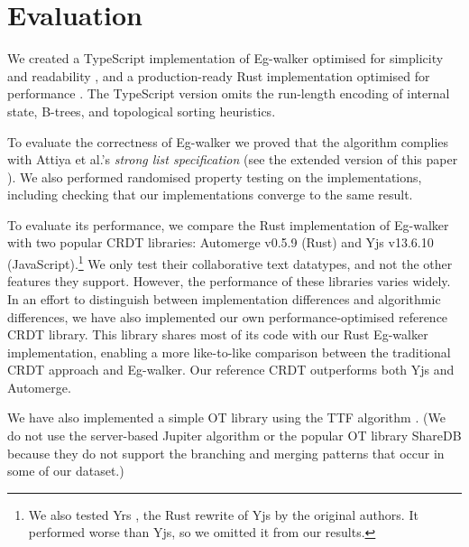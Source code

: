 \documentclass[sigplan,10pt]{acmart}
\newif\ifincludeappendix
\newcommand{\algname}{Eg-walker\xspace}
\begin{document}
\section{Evaluation}\label{benchmarking}


We created a TypeScript implementation of \algname optimised for simplicity and readability \cite{reference-reg}, and a production-ready Rust implementation optimised for performance \cite{dt}.
The TypeScript version omits the run-length encoding of internal state, B-trees, and topological sorting heuristics.

To evaluate the correctness of \algname we proved that the algorithm complies with Attiya et al.'s \emph{strong list specification} \cite{Attiya2016} (see \ifincludeappendix\autoref{proofs}\else the extended version of this paper \cite{extended-version}\fi).
We also performed randomised property testing on the implementations, including checking that our implementations converge to the same result.

To evaluate its performance, we compare the Rust implementation of \algname with two popular CRDT libraries: Automerge v0.5.9 \cite{automerge} (Rust) and Yjs v13.6.10 \cite{yjs} (JavaScript).\footnote{We also tested Yrs \cite{yrs}, the Rust rewrite of Yjs by the original authors. It performed worse than Yjs, so we omitted it from our results.}
We only test their collaborative text datatypes, and not the other features they support.
However, the performance of these libraries varies widely.
In an effort to distinguish between implementation differences and algorithmic differences, we have also implemented our own performance-optimised reference CRDT library.
This library shares most of its code with our Rust \algname implementation, enabling a more like-to-like comparison between the traditional CRDT approach and \algname.
Our reference CRDT outperforms both Yjs and Automerge.

We have also implemented a simple OT library using the TTF algorithm \cite{Oster2006TTF}.
(We do not use the server-based Jupiter algorithm \cite{Nichols1995} or the popular OT library ShareDB \cite{sharedb} because they do not support the branching and merging patterns that occur in some of our dataset.)
\end{document}
